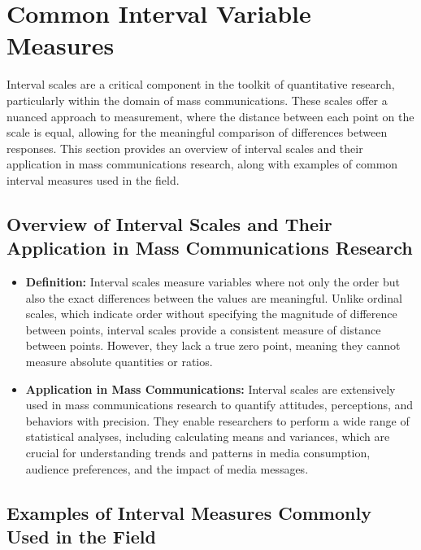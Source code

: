 \documentclass[
]{book}
\begin{document}
\hypertarget{common-interval-variable-measures}{%
\section{Common Interval Variable Measures}\label{common-interval-variable-measures}}

Interval scales are a critical component in the toolkit of quantitative research, particularly within the domain of mass communications. These scales offer a nuanced approach to measurement, where the distance between each point on the scale is equal, allowing for the meaningful comparison of differences between responses. This section provides an overview of interval scales and their application in mass communications research, along with examples of common interval measures used in the field.

\hypertarget{overview-of-interval-scales-and-their-application-in-mass-communications-research}{%
\subsection*{Overview of Interval Scales and Their Application in Mass Communications Research}\label{overview-of-interval-scales-and-their-application-in-mass-communications-research}}

\begin{itemize}
\item
  \textbf{Definition:} Interval scales measure variables where not only the order but also the exact differences between the values are meaningful. Unlike ordinal scales, which indicate order without specifying the magnitude of difference between points, interval scales provide a consistent measure of distance between points. However, they lack a true zero point, meaning they cannot measure absolute quantities or ratios.
\item
  \textbf{Application in Mass Communications:} Interval scales are extensively used in mass communications research to quantify attitudes, perceptions, and behaviors with precision. They enable researchers to perform a wide range of statistical analyses, including calculating means and variances, which are crucial for understanding trends and patterns in media consumption, audience preferences, and the impact of media messages.
\end{itemize}

\hypertarget{examples-of-interval-measures-commonly-used-in-the-field}{%
\subsection*{Examples of Interval Measures Commonly Used in the Field}\label{examples-of-interval-measures-commonly-used-in-the-field}}
\end{document}
